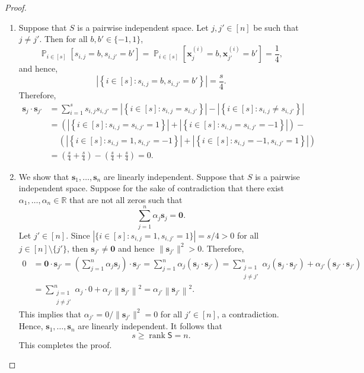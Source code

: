 \documentclass[letterpaper, reqno,11pt]{article}
\newcommand{\RR}{\mathbb{R}}
\newcommand{\PP}{\mathop{{}\mathbb{P}}}
\DeclareMathOperator{\rank}{rank}
\begin{document}
\begin{enumerate}
\begin{enumerate}
\begin{proof}
      \begin{enumerate}[label=(\roman*)]
        \item Suppose that $S$ is a pairwise independent space. Let $j, j' \in [n]$ be such that $j \neq j'$. Then for all $b, b' \in \{ -1, 1 \}$,
        $$ \PP_{i \in [s]} \left[s_{i, j} = b, s_{i, j'} = b'\right] = \PP_{i \in [s]}\left[\mathbf x_j^{(i)} = b, \mathbf x_{j'}^{(i)} = b'\right] = \frac{1}{4}, $$
        and hence,
        $$ \left|\left\{ i \in [s] : s_{i, j} = b, s_{i, j'} = b' \right\}\right| = \frac{s}{4}. $$
        Therefore,
        \begin{align*}
          \mathbf s_j \cdot \mathbf s_{j'} &= \sum_{i = 1}^s s_{i, j} s_{i, j'} = \left|\left\{ i \in [s] : s_{i, j} = s_{i, j'} \right\}\right| - \left|\left\{ i \in [s] : s_{i, j} \neq s_{i, j'} \right\}\right| \\
          &= \left(\left|\left\{ i \in [s] : s_{i, j} = s_{i, j'} = 1 \right\}\right| + \left|\left\{ i \in [s] : s_{i, j} = s_{i, j'} = -1 \right\}\right|\right) - \\
          &\quad\, \left(\left|\left\{ i \in [s] : s_{i, j} = 1, s_{i, j'} = -1 \right\}\right| + \left|\left\{ i \in [s] : s_{i, j} = -1, s_{i, j'} = 1 \right\}\right|\right) \\
          &= \left(\frac{s}{4} + \frac{s}{4}\right) - \left(\frac{s}{4} + \frac{s}{4}\right) = 0.
        \end{align*}
        \item We show that $\mathbf s_1, \ldots, \mathbf s_n$ are linearly independent. Suppose that $S$ is a pairwise independent space. Suppose for the sake of contradiction that there exist $\alpha_1, \ldots, \alpha_n \in \RR$ that are not all zeros such that
        $$ \sum_{j = 1}^n \alpha_j \mathbf s_j = \mathbf 0. $$
        Let $j' \in [n]$. Since $|\{ i \in [s] : s_{i, j} = 1, s_{i, j'} = 1 \}| = s/4 > 0$ for all $j \in [n] \setminus \{ j' \}$, then $\mathbf s_{j'} \neq \mathbf 0$ and hence $\|\mathbf s_{j'}\|^2 > 0$. Therefore,
        \begin{align*}
          0 &= \mathbf 0 \cdot \mathbf s_{j'} = \left(\sum_{j = 1}^n \alpha_j \mathbf s_j\right) \cdot \mathbf s_{j'} = \sum_{j = 1}^n \alpha_j \left(\mathbf s_j \cdot \mathbf s_{j'}\right) = \sum_{\substack{j = 1 \\ j \neq j'}}^n \alpha_j \left(\mathbf s_j \cdot \mathbf s_{j'}\right) + \alpha_{j'} \left(\mathbf s_{j'} \cdot \mathbf s_{j'}\right) \\
          &= \sum_{\substack{j = 1 \\ j \neq j'}}^n \alpha_j \cdot 0 + \alpha_{j'} \left\| \mathbf s_{j'} \right\|^2 = \alpha_{j'} \left\| \mathbf s_{j'} \right\|^2.
        \end{align*}
        This implies that $\alpha_{j'} = 0/\| \mathbf s_{j'} \|^2 = 0$ for all $j' \in [n]$, a contradiction. Hence, $\mathbf s_1, \ldots, \mathbf s_n$ are linearly independent. It follows that
        $$ s \geq \rank \mathsf{S} = n. $$
        This completes the proof.
      \end{enumerate}
    \end{proof}


\end{enumerate}
\end{enumerate}
\end{document}
